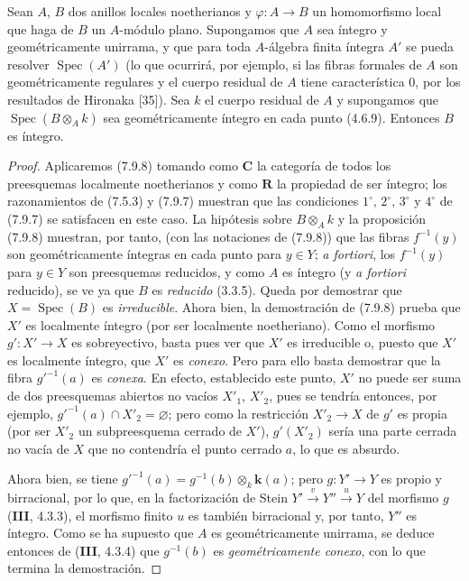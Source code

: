 \begin{corollary}[7.9.9]
\label{IV.2.s7.9.9-fr}
Sean $A$, $B$ dos anillos locales noetherianos y $\varphi:A\to B$ un
homomorfismo local que haga de $B$ un $A$-módulo plano. Supongamos que $A$ sea
íntegro y geométricamente unirrama, y que para toda $A$-álgebra finita
íntegra $A'$ se pueda resolver $\operatorname{Spec}(A')$ \textup{(lo que ocurrirá, por
ejemplo, si las fibras formales de $A$ son geométricamente regulares
y el cuerpo residual de $A$ tiene característica $0$, por los resultados de
Hironaka [35])}. Sea $k$ el cuerpo residual de $A$ y supongamos que
$\operatorname{Spec}(B\otimes_Ak)$ sea geométricamente íntegro en cada punto
\textup{(4.6.9)}. Entonces $B$ es íntegro.
\end{corollary}

\begin{proof}
Aplicaremos (7.9.8) tomando como $\boldsymbol{C}$ la categoría de
todos los preesquemas localmente noetherianos y como $\boldsymbol R$ la propiedad
de ser íntegro; los razonamientos de (7.5.3) y (7.9.7) muestran que las
condiciones $1^\circ$, $2^\circ$, $3^\circ$ y $4^\circ$ de (7.9.7) se
satisfacen en este caso. La hipótesis sobre $B\otimes_Ak$ y la proposición
(7.9.8) muestran, por tanto, (con las notaciones de (7.9.8)) que las fibras
$f^{-1}(y)$ son geométricamente íntegras en cada punto para $y\in Y$;
\emph{a fortiori}, los $f^{-1}(y)$ para $y\in Y$ son preesquemas reducidos,
y como $A$ es íntegro (y \emph{a fortiori} reducido), se ve ya que $B$
es \emph{reducido} (3.3.5). Queda por demostrar que $X=\operatorname{Spec}(B)$ es
\emph{irreducible}. Ahora bien, la demostración de (7.9.8) prueba que $X'$ es localmente
íntegro (por ser localmente noetheriano). Como el morfismo $g':X'\to X$ es
sobreyectivo, basta pues ver que $X'$ es irreducible o, puesto que $X'$
es localmente íntegro, que $X'$ es \emph{conexo}. Pero para ello basta
demostrar que la fibra $g'^{-1}(a)$ es \emph{conexa}. En efecto, establecido este punto,
$X'$ no puede ser suma de dos preesquemas abiertos no vacíos $X'_1$,
$X'_2$, pues se tendría entonces, por ejemplo,
$g'^{-1}(a)\cap X'_2=\varnothing$; pero como la restricción $X'_2\to X$ de $g'$
es propia (por ser $X'_2$ un subpreesquema cerrado de $X'$),
$g'(X'_2)$ sería una parte cerrada no vacía de $X$ que no contendría el punto
cerrado $a$, lo que es absurdo.

Ahora bien, se tiene
$g'^{-1}(a)=g^{-1}(b)\otimes_k \boldsymbol{k}(a)$; pero $g:Y'\to Y$ es propio y
birracional, por lo que, en la factorización de Stein
$Y'\xrightarrow{v}Y''\xrightarrow{u}Y$ del morfismo $g$ (\textbf{III}, 4.3.3),
el morfismo finito $u$ es también birracional y, por tanto, $Y''$ es íntegro.
Como se ha supuesto que $A$ es geométricamente unirrama, se deduce entonces de
(\textbf{III}, 4.3.4) que $g^{-1}(b)$ es \emph{geométricamente conexo}, con lo que
termina la demostración.
\end{proof}
